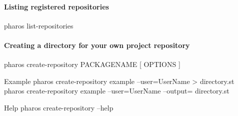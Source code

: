 \documentclass[a4paper,10pt,twoside]{book}
\begin{document}
	\paragraph{Listing registered repositories\newline}
	
	
		pharos list-repositories
		
		
	\paragraph{Creating a directory for your own project repository\newline}

		pharos create-repository PACKAGENAME [ OPTIONS ]\newline

		Example \newline
			\-\-pharos create-repository example --user=UserName > directory.st\newline
			\-\-pharos create-repository example --user=UserName  --output= directory.st\newline
		
		Help \newline
			\-\-pharos create-repository --help \newline




\ifx\wholebook\relax\else
\end{document}
